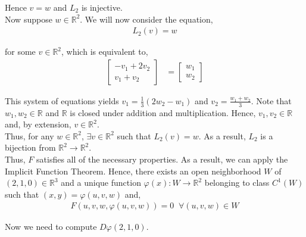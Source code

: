 \documentclass[12pt]{article}
\newenvironment{problem}[2][Problem]{\begin{trivlist}
\item[\hskip \labelsep {\bfseries #1}\hskip \labelsep {\bfseries #2.}]}{\end{trivlist}}
\begin{document}
Hence $v = w$ and $L_2$ is injective.\\

Now suppose $w \in \mathbb{R}^2$. We will now consider the equation,
\begin{align*}
L_2(v) = w
\end{align*}

for some $v \in \mathbb{R}^2$, which is equivalent to,
\begin{align*}
\begin{bmatrix}
-v_1 + 2v_2 \\
v_1 + v_2
\end{bmatrix} &= \begin{bmatrix} w_1 \\ w_2 \end{bmatrix}
\end{align*}

This system of equations yields $v_1 = \frac{1}{3} (2w_2 - w_1)$ and $v_2 = \frac{w_1 + w_2}{3}$. Note that $w_1, w_2 \in \mathbb{R}$ and $\mathbb{R}$ is closed under addition and multiplication. Hence, $v_1, v_2 \in \mathbb{R}$ and, by extension, $v \in \mathbb{R}^2$.\\

Thus, for any $w \in \mathbb{R}^2$, $\exists v \in \mathbb{R}^2$ such that $L_2(v) = w$. As a result, $L_2$ is a bijection from $\mathbb{R}^2 \to \mathbb{R}^2$.\\

Thus, $F$ satisfies all of the necessary properties. As a result, we can apply the Implicit Function Theorem. Hence, there exists an open neighborhood $W$ of $(2, 1, 0) \in \mathbb{R}^3$ and a unique function $\varphi(x): W \to \mathbb{R}^2$ belonging to class $C^1(W)$ such that $(x, y)= \varphi(u, v, w)$ and,
\begin{align*}
F(u, v, w, \varphi(u, v, w)) = 0 \;\; \forall (u, v, w) \in W
\end{align*}

Now we need to compute $D\varphi (2, 1, 0)$.

\begin{problem}{3}
\end{problem}

\begin{problem}{4}
\end{problem}

\begin{problem}{5}
\end{problem}
\end{document}
